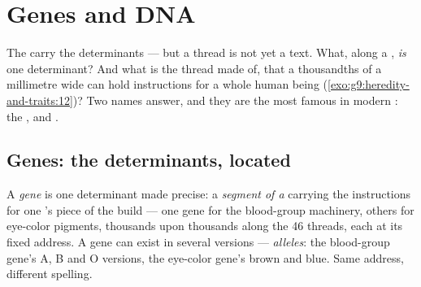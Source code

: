 \chapter{Genes and DNA}\label{ch:g9:genes-and-dna}

The  carry the determinants --- but a thread is
not yet a text. What, along a , \emph{is} one
determinant? And what is the thread made of, that a 
thousandths of a millimetre wide can hold instructions for a
whole human being
(\cref{exo:g9:heredity-and-traits:12})? Two names answer,
and they are the most famous in modern : the ,
and .

\section{Genes: the determinants, located}

\begin{definition}\label{def:g9:genes-and-dna:gene}
A \emph{gene} is one determinant made precise:
a \emph{segment of a } carrying the instructions
for one 's piece of the build --- one gene for the
blood-group machinery, others for eye-color pigments,
thousands upon thousands along the 46 threads, each at its
fixed address. A gene can exist in several versions ---
\emph{alleles}: the blood-group gene's A, B
and O versions, the eye-color gene's brown and blue. Same
address, different spelling.
\end{definition}

